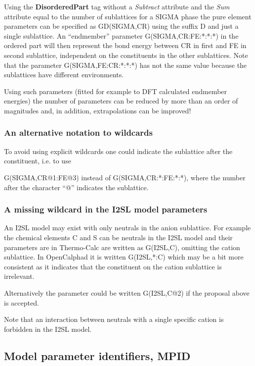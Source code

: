 \documentclass{article}
\begin{document}
Using the {\bf DisorderedPart} tag without a {\em Subtract} attribute
and the {\em Sum} attribute equal to the number of sublattices for a
SIGMA phase the pure element parameters can be specified as
GD(SIGMA,CR) using the suffix D and just a single sublattice.  An
``endmember'' parameter G(SIGMA,CR:FE:*:*:*) in the ordered part will
then represent the bond energy between CR in first and FE in second
sublattice, independent on the constituents in the other sublattices.
Note that the parameter G(SIGMA,FE:CR:*:*:*) has not the same value
because the sublattices have different environments.

Using such parameters (fitted for example to DFT calculated endmember
energies) the number of parameters can be reduced by more than an
order of magnitudes and, in addition, extrapolations can be improved!

\subsubsection{An alternative notation to wildcards}

To avoid using explicit wildcards one could indicate the sublattice
after the constituent, i.e. to use

G(SIGMA,CR@1:FE@3) instead of G(SIGMA,CR:*:FE:*:*), where the number
after the character ``@'' indicates the sublattice.

\subsubsection{A missing wildcard in the I2SL model parameters}

An I2SL model may exist with only neutrals in the anion sublattice.
For example the chemical elements C and S can be neutrals in the I2SL
model and their parameters are in Thermo-Calc are written as
G(I2SL,C), omitting the cation sublattice.  In OpenCalphad it is
written G(I2SL,*:C) which may be a bit more consistent as it indicates
that the constituent on the cation sublattice is irrelevant.

Alternatively the parameter could be written G(I2SL,C@2) if the
proposal above is accepted.

Note that an interaction between neutrals with a single specific
cation is forbidden in the I2SL model.


\newpage 

\subsection{Model parameter identifiers, MPID}\label{sec:mpid}
\end{document}
